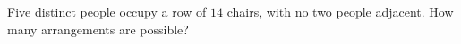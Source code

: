 Five distinct people occupy a row of $14$ chairs, with no two people adjacent. How many arrangements are possible?
